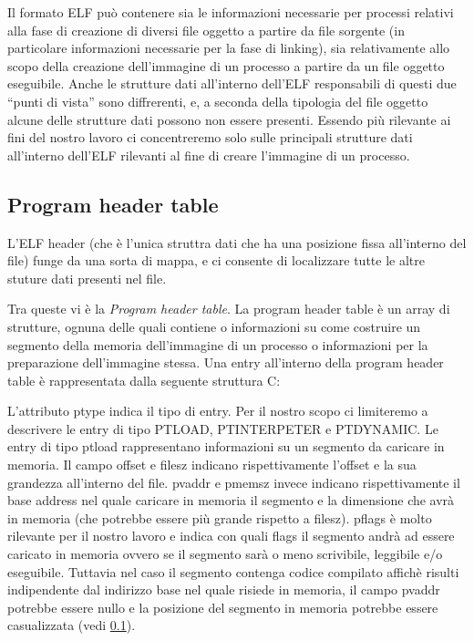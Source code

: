 Il formato ELF può contenere sia le informazioni necessarie per
processi relativi alla fase di creazione di diversi file oggetto a
partire da file sorgente (in particolare informazioni necessarie per
la fase di linking), sia relativamente allo scopo della creazione
dell'immagine di un processo a partire da un file oggetto
eseguibile. Anche le strutture dati all'interno dell'ELF responsabili
di questi due ``punti di vista'' sono diffrerenti, e, a seconda della
tipologia del file oggetto alcune delle strutture dati possono non
essere presenti. Essendo più rilevante ai fini del nostro lavoro ci
concentreremo solo sulle principali strutture dati all'interno
dell'ELF rilevanti al fine di creare l'immagine di un processo.

\subsection{Program header table}

L'ELF header (che è l'unica struttra dati che ha una posizione fissa
all'interno del file) funge da una sorta di mappa, e ci consente di
localizzare tutte le altre stuture dati presenti nel file.

Tra queste vi è la \emph{Program header table}. La program header table è
un array di strutture, ognuna delle quali contiene o informazioni su
come costruire un segmento della memoria dell'immagine di un processo
o informazioni per la preparazione dell'immagine stessa. Una entry
all'interno della program header table è rappresentata dalla seguente
struttura C:



L'attributo ptype indica il tipo di entry. Per il nostro scopo ci
limiteremo a descrivere le entry di tipo PTLOAD, PTINTERPETER e
PTDYNAMIC. Le entry di tipo ptload rappresentano informazioni su un
segmento da caricare in memoria. Il campo offset e filesz indicano
rispettivamente l'offset e la sua grandezza all'interno del
file. pvaddr e pmemsz invece indicano rispettivamente il base
address nel quale caricare in memoria il segmento e la dimensione che
avrà in memoria (che potrebbe essere più grande rispetto a
filesz). pflags è molto rilevante per il nostro lavoro e indica con
quali flags il segmento andrà ad essere caricato in memoria ovvero se
il segmento sarà o meno scrivibile, leggibile e/o eseguibile. Tuttavia
nel caso il segmento contenga codice compilato affichè risulti
indipendente dal indirizzo base nel quale risiede in memoria, il campo
pvaddr potrebbe essere nullo e la posizione del segmento in memoria
potrebbe essere casualizzata (vedi \ref{}).

